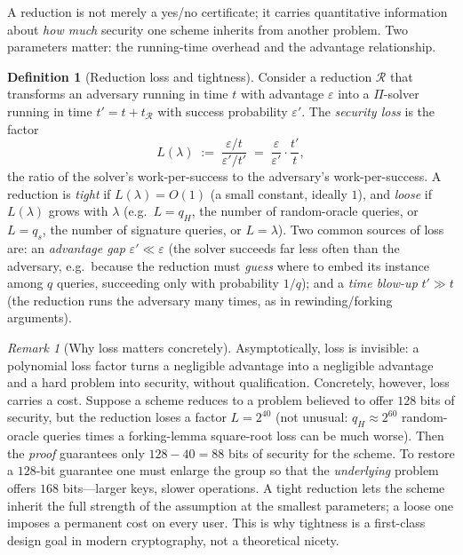 \documentclass[11pt,a4paper]{article}
\theoremstyle{definition}
\newtheorem{definition}[theorem]{Definition}
\theoremstyle{remark}
\newtheorem{remark}[theorem]{Remark}
\begin{document}
A reduction is not merely a yes/no certificate; it carries quantitative
information about \emph{how much} security one scheme inherits from another
problem. Two parameters matter: the running-time overhead and the advantage
relationship.

\begin{definition}[Reduction loss and tightness]\label{model:def:tightness}
Consider a reduction \(\mathcal{R}\) that transforms an adversary running in time
\(t\) with advantage \(\varepsilon\) into a \(\Pi\)-solver running in time
\(t' = t + t_{\mathcal{R}}\) with success probability \(\varepsilon'\). The
\emph{security loss} is the factor
\[
  L(\lambda) \;:=\; \frac{\varepsilon / t}{\varepsilon' / t'}
  \;=\; \frac{\varepsilon}{\varepsilon'}\cdot\frac{t'}{t},
\]
the ratio of the solver's work-per-success to the adversary's
work-per-success. A reduction is \emph{tight} if \(L(\lambda) = O(1)\) (a small
constant, ideally \(1\)), and \emph{loose} if \(L(\lambda)\) grows with
\(\lambda\) (e.g.\ \(L = q_H\), the number of random-oracle queries, or \(L =
q_s\), the number of signature queries, or \(L = \lambda\)). Two common sources of
loss are: an \emph{advantage gap} \(\varepsilon' \ll \varepsilon\) (the solver
succeeds far less often than the adversary, e.g.\ because the reduction must
\emph{guess} where to embed its instance among \(q\) queries, succeeding only
with probability \(1/q\)); and a \emph{time blow-up} \(t' \gg t\) (the reduction
runs the adversary many times, as in rewinding/forking arguments).
\end{definition}

\begin{remark}[Why loss matters concretely]\label{model:rem:loss-matters}
Asymptotically, loss is invisible: a polynomial loss factor turns a negligible
advantage into a negligible advantage and a hard problem into security, without
qualification. Concretely, however, loss carries a cost. Suppose a scheme
reduces to a problem believed to offer \(128\) bits of security, but the
reduction loses a factor
\(L = 2^{40}\) (not unusual: \(q_H \approx 2^{60}\) random-oracle queries times a
forking-lemma square-root loss can be much worse). Then the \emph{proof}
guarantees only \(128 - 40 = 88\) bits of security for the scheme. To restore a
\(128\)-bit guarantee one must enlarge the group so that the \emph{underlying}
problem offers \(168\) bits---larger keys, slower operations. A tight reduction
lets the scheme inherit the full strength of the assumption at the smallest
parameters; a loose one imposes a permanent cost on every user. This is why
tightness is a first-class design goal in modern cryptography, not a theoretical
nicety.
\end{remark}
\end{document}
